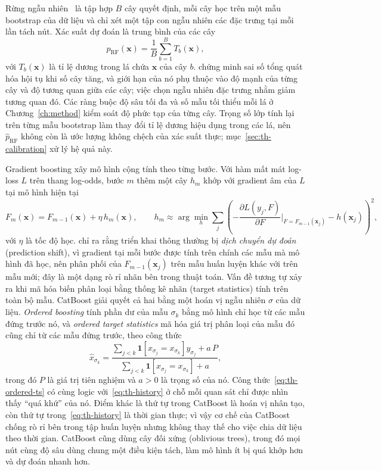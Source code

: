Rừng ngẫu nhiên~\parencite{breiman2001} là tập hợp $B$ cây quyết định, mỗi cây học trên một mẫu bootstrap của dữ liệu và chỉ xét một tập con ngẫu nhiên các đặc trưng tại mỗi lần tách nút. Xác suất dự đoán là trung bình của các cây
\begin{equation}\label{eq:th-rf}
  \hat{p}_{\mathrm{RF}}(\mathbf{x}) = \frac{1}{B} \sum_{b=1}^{B} T_b(\mathbf{x}),
\end{equation}
với $T_b(\mathbf{x})$ là tỉ lệ dương trong lá chứa $\mathbf{x}$ của cây $b$. \textcite{breiman2001} chứng minh sai số tổng quát hóa hội tụ khi số cây tăng, và giới hạn của nó phụ thuộc vào độ mạnh của từng cây và độ tương quan giữa các cây; việc chọn ngẫu nhiên đặc trưng nhằm giảm tương quan đó. Các ràng buộc độ sâu tối đa và số mẫu tối thiểu mỗi lá ở Chương~\ref{ch:method} kiểm soát độ phức tạp của từng cây. Trọng số lớp tính lại trên từng mẫu bootstrap làm thay đổi tỉ lệ dương hiệu dụng trong các lá, nên $\hat p_{\mathrm{RF}}$ không còn là ước lượng không chệch của xác suất thực; mục~\ref{sec:th-calibration} xử lý hệ quả này.

Gradient boosting xây mô hình cộng tính theo từng bước. Với hàm mất mát log-loss $L$ trên thang log-odds, bước $m$ thêm một cây $h_m$ khớp với gradient âm của $L$ tại mô hình hiện tại
\begin{equation}\label{eq:th-gb}
  F_m(\mathbf{x}) = F_{m-1}(\mathbf{x}) + \eta\, h_m(\mathbf{x}), \qquad
  h_m \approx \arg\min_h \sum_{j} \left( -\frac{\partial L(y_j, F)}{\partial F}\Big|_{F=F_{m-1}(\mathbf{x}_j)} - h(\mathbf{x}_j) \right)^2,
\end{equation}
với $\eta$ là tốc độ học. \textcite{prokhorenkova2018} chỉ ra rằng triển khai thông thường bị \emph{dịch chuyển dự đoán} (prediction shift), vì gradient tại mỗi bước được tính trên chính các mẫu mà mô hình đã học, nên phân phối của $F_{m-1}(\mathbf{x}_j)$ trên mẫu huấn luyện khác với trên mẫu mới; đây là một dạng rò rỉ nhãn bên trong thuật toán. Vấn đề tương tự xảy ra khi mã hóa biến phân loại bằng thống kê nhãn (target statistics) tính trên toàn bộ mẫu. CatBoost giải quyết cả hai bằng một hoán vị ngẫu nhiên $\sigma$ của dữ liệu. \emph{Ordered boosting} tính phần dư của mẫu $\sigma_k$ bằng mô hình chỉ học từ các mẫu đứng trước nó, và \emph{ordered target statistics} mã hóa giá trị phân loại của mẫu đó cũng chỉ từ các mẫu đứng trước, theo công thức
\begin{equation}\label{eq:th-ordered-ts}
  \hat{x}_{\sigma_k} =
  \frac{\sum_{j<k} \mathbf{1}\!\left[x_{\sigma_j} = x_{\sigma_k}\right] y_{\sigma_j} + a\,P}
       {\sum_{j<k} \mathbf{1}\!\left[x_{\sigma_j} = x_{\sigma_k}\right] + a},
\end{equation}
trong đó $P$ là giá trị tiên nghiệm và $a > 0$ là trọng số của nó. Công thức~\eqref{eq:th-ordered-ts} có cùng logic với~\eqref{eq:th-history} ở chỗ mỗi quan sát chỉ được nhìn thấy ``quá khứ'' của nó. Điểm khác là thứ tự trong CatBoost là hoán vị nhân tạo, còn thứ tự trong~\eqref{eq:th-history} là thời gian thực; vì vậy cơ chế của CatBoost chống rò rỉ bên trong tập huấn luyện nhưng không thay thế cho việc chia dữ liệu theo thời gian. CatBoost cũng dùng cây đối xứng (oblivious trees), trong đó mọi nút cùng độ sâu dùng chung một điều kiện tách, làm mô hình ít bị quá khớp hơn và dự đoán nhanh hơn.

